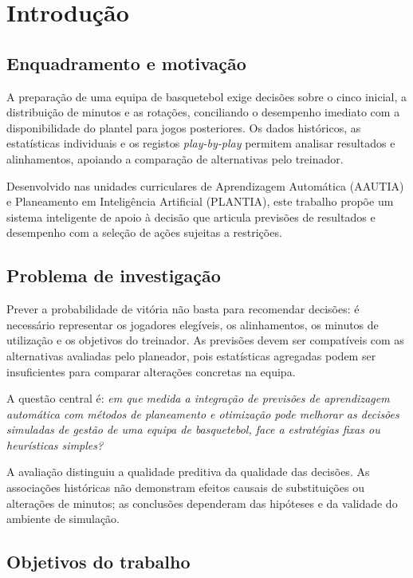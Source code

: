 \chapter{Introdução}
\label{chap:introducao}

\section{Enquadramento e motivação}

A preparação de uma equipa de basquetebol exige decisões sobre o cinco
inicial, a distribuição de minutos e as rotações, conciliando o desempenho
imediato com a disponibilidade do plantel para jogos posteriores. Os dados
históricos, as estatísticas individuais e os registos \emph{play-by-play}
permitem analisar resultados e alinhamentos, apoiando a comparação de
alternativas pelo treinador.

Desenvolvido nas unidades curriculares de Aprendizagem Automática (AAUTIA)
e Planeamento em Inteligência Artificial (PLANTIA), este trabalho propõe
um sistema inteligente de apoio à decisão que articula previsões de
resultados e desempenho com a seleção de ações sujeitas a restrições.

\section{Problema de investigação}

Prever a probabilidade de vitória não basta para recomendar decisões:
é necessário representar os jogadores elegíveis, os alinhamentos, os
minutos de utilização e os objetivos do treinador. As previsões devem
ser compatíveis com as alternativas avaliadas pelo planeador, pois
estatísticas agregadas podem ser insuficientes para comparar alterações
concretas na equipa.

A questão central é: \emph{em que medida a integração de previsões de
aprendizagem automática com métodos de planeamento e otimização pode
melhorar as decisões simuladas de gestão de uma equipa de basquetebol,
face a estratégias fixas ou heurísticas simples?}

A avaliação distinguiu a qualidade preditiva da qualidade das decisões.
As associações históricas não demonstram efeitos causais de substituições
ou alterações de minutos; as conclusões dependeram das hipóteses e da
validade do ambiente de simulação.

\section{Objetivos do trabalho}

